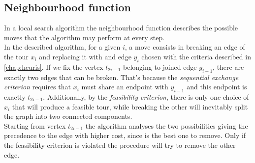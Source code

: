 \subsection{Neighbourhood function}
\label{ssec:neighbourhood}
In a local search algorithm the neighbourhood function describes the possible moves that the algorithm may perform at every step.\\
In the described algorithm, for a given $i$, a move consists in breaking an edge of the tour $x_i$ and replacing it with  and edge $y_i$ chosen with the criteria described in \cref{chap:heuris}.
If we fix the vertex $t_{2i-1}$ belonging to joined edge $y_{i-1}$, there are exactly two edges that can be broken. That's because the \emph{sequential exchange criterion} requires that $x_i$ must share an endpoint with $y_{i-1}$ and this endpoint is exactly $t_{2i-1}$. Additionally, by the \emph{feasibility criterion}, there is only one choice of $x_i$ that will produce a feasible tour, while breaking the other will inevitably split the graph into two connected components. \\
Starting from vertex $t_{2i-1}$ the algorithm analyses the two possibilities giving the precedence to the edge with higher cost, since is the best one to remove. Only if the feasibility criterion is violated the procedure will try to remove the other edge.\\

